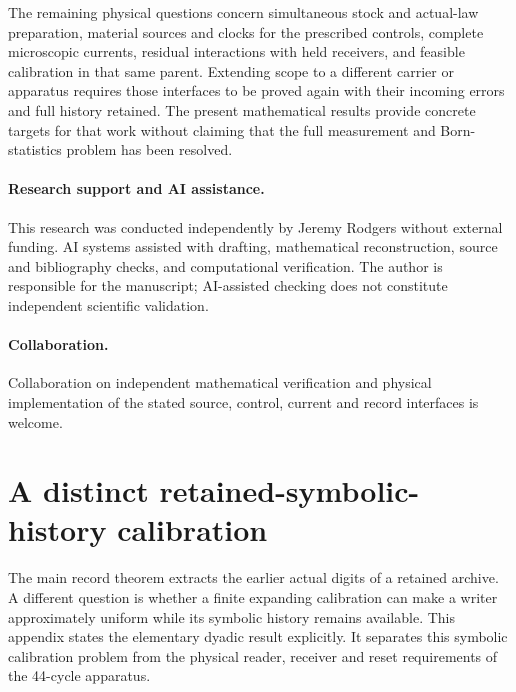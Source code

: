 \documentclass[11pt]{article}
\numberwithin{equation}{section}
\theoremstyle{definition}
\theoremstyle{remark}
\begin{document}
The remaining physical questions concern simultaneous stock and
actual-law preparation, material sources and clocks for the prescribed
controls, complete microscopic currents, residual interactions with
held receivers, and feasible calibration in that same parent.
Extending scope to a different carrier or apparatus requires those
interfaces to be proved again with their incoming errors and full
history retained. The present mathematical results provide concrete
targets for that work without claiming that the full measurement and
Born-statistics problem has been resolved.

\paragraph{Research support and AI assistance.}
This research was conducted independently by Jeremy Rodgers without
external funding. AI systems assisted with drafting, mathematical
reconstruction, source and bibliography checks, and computational
verification. The author is responsible for the manuscript; AI-assisted
checking does not constitute independent scientific validation.

\paragraph{Collaboration.}
Collaboration on independent mathematical verification and physical
implementation of the stated source, control, current and record
interfaces is welcome.

\appendix
\section{A distinct retained-symbolic-history calibration}
\label{p2s:sec:alternative}

The main record theorem extracts the earlier actual digits of a retained
archive. A different question is whether a finite expanding calibration
can make a writer approximately uniform while its symbolic history remains
available. This appendix states the elementary dyadic result explicitly.
It separates this symbolic calibration problem from the physical
reader, receiver and reset requirements of the 44-cycle apparatus.
\end{document}
